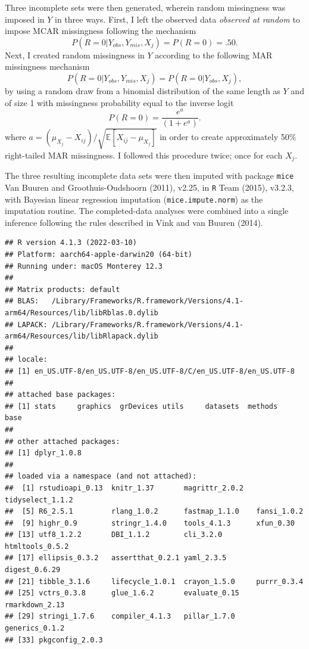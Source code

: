 \documentclass[
]{article}
\begin{document}
Three incomplete sets were then generated, wherein random missingness
was imposed in \(Y\) in three ways. First, I left the observed data
\emph{observed at random} to impose MCAR missingness following the
mechanism \[
P(R=0|Y_{obs},Y_{mis}, X_j)=P(R=0)=.50.
\] Next, I created random missingness in \(Y\) according to the
following MAR missingness mechanism \[
P(R=0|Y_{obs},Y_{mis}, X_j)=P(R=0|Y_{obs}, X_j),
\] by using a random draw from a binomial distribution of the same
length as \(Y\) and of size 1 with missingness probability equal to the
inverse logit \[
P(R=0)=\frac{e^{a}}{(1+e^{a})}.
\] where \(a=(\mu_{X_j}-X_{ij})/\sqrt{\mathbb{E}[X_{ij} - \mu_{X_j}]}\)
in order to create approximately 50\% right-tailed MAR missingness. I
followed this procedure twice; once for each \(X_j\).

The three resulting incomplete data sets were then imputed with package
\texttt{mice} Van Buuren and Groothuis-Oudshoorn (2011), v2.25, in
\texttt{R} Team (2015), v3.2.3, with Bayesian linear regression
imputation (\texttt{mice.impute.norm}) as the imputation routine. The
completed-data analyses were combined into a single inference following
the rules described in Vink and van Buuren (2014).

\begin{verbatim}
## R version 4.1.3 (2022-03-10)
## Platform: aarch64-apple-darwin20 (64-bit)
## Running under: macOS Monterey 12.3
## 
## Matrix products: default
## BLAS:   /Library/Frameworks/R.framework/Versions/4.1-arm64/Resources/lib/libRblas.0.dylib
## LAPACK: /Library/Frameworks/R.framework/Versions/4.1-arm64/Resources/lib/libRlapack.dylib
## 
## locale:
## [1] en_US.UTF-8/en_US.UTF-8/en_US.UTF-8/C/en_US.UTF-8/en_US.UTF-8
## 
## attached base packages:
## [1] stats     graphics  grDevices utils     datasets  methods   base     
## 
## other attached packages:
## [1] dplyr_1.0.8
## 
## loaded via a namespace (and not attached):
##  [1] rstudioapi_0.13  knitr_1.37       magrittr_2.0.2   tidyselect_1.1.2
##  [5] R6_2.5.1         rlang_1.0.2      fastmap_1.1.0    fansi_1.0.2     
##  [9] highr_0.9        stringr_1.4.0    tools_4.1.3      xfun_0.30       
## [13] utf8_1.2.2       DBI_1.1.2        cli_3.2.0        htmltools_0.5.2 
## [17] ellipsis_0.3.2   assertthat_0.2.1 yaml_2.3.5       digest_0.6.29   
## [21] tibble_3.1.6     lifecycle_1.0.1  crayon_1.5.0     purrr_0.3.4     
## [25] vctrs_0.3.8      glue_1.6.2       evaluate_0.15    rmarkdown_2.13  
## [29] stringi_1.7.6    compiler_4.1.3   pillar_1.7.0     generics_0.1.2  
## [33] pkgconfig_2.0.3
\end{verbatim}
\end{document}
